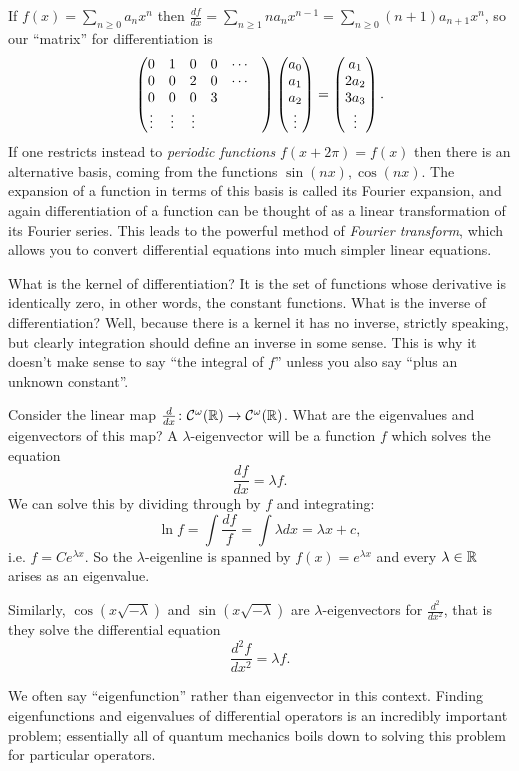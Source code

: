 \documentclass{article}
\begin{document}
If \(f(x)=\sum_{n\geq 0}a_nx^n\) then \(\frac{df}{dx}=\sum_{n\geq 1}
na_nx^{n-1}=\sum_{n\geq 0}(n+1)a_{n+1}x^n\), so our ``matrix'' for
differentiation is
\[\begin{pmatrix} 0 & 1 & 0 & 0 & \cdots \\ 0 & 0 & 2 & 0 & \cdots \\0 & 0 & 0 & 3 &
\\ \vdots & \vdots & \vdots & & &\end{pmatrix}\begin{pmatrix} a_0 \\ a_1 \\ a_2
\\ \vdots\end{pmatrix}=\begin{pmatrix} a_1 \\ 2a_2 \\ 3a_3\\\vdots\end{pmatrix}.\]
If one restricts instead to {\em periodic functions}
\(f(x+2\pi)=f(x)\) then there is an alternative basis, coming from the
functions \(\sin(nx),\cos(nx)\). The expansion of a function in terms
of this basis is called its Fourier expansion, and again
differentiation of a function can be thought of as a linear
transformation of its Fourier series. This leads to the powerful
method of {\em Fourier transform}, which allows you to convert
differential equations into much simpler linear equations.


\begin{Example}
What is the kernel of differentiation? It is the set of functions
whose derivative is identically zero, in other words, the constant
functions. What is the inverse of differentiation? Well, because
there is a kernel it has no inverse, strictly speaking, but clearly
integration should define an inverse in some sense. This is why it
doesn't make sense to say ``the integral of \(f\)'' unless you also
say ``plus an unknown constant''.


\end{Example}
\begin{Example}
Consider the linear map
\(\frac{d}{dx}\colon\mathcal{C}^{\omega}(\mathbb{R})\to\mathcal{C}^{\omega}(\mathbb{R})\). What
are the eigenvalues and eigenvectors of this map? A
\(\lambda\)-eigenvector will be a function \(f\) which solves the
equation \[\frac{df}{dx}=\lambda f.\] We can solve this by dividing
through by \(f\) and integrating: \[\ln
f=\int\frac{df}{f}=\int\lambda dx=\lambda x+c,\]
i.e. \(f=Ce^{\lambda x}\). So the \(\lambda\)-eigenline is spanned
by \(f(x)=e^{\lambda x}\) and every \(\lambda\in\mathbb{R}\) arises as an
eigenvalue.


\end{Example}
\begin{Example}
Similarly, \(\cos(x\sqrt{-\lambda})\) and \(\sin(x\sqrt{-\lambda})\)
are \(\lambda\)-eigenvectors for \(\frac{d^2}{dx^2}\), that is they
solve the differential equation
\[\frac{d^2f}{dx^2}=\lambda f.\]


\end{Example}
We often say ``eigenfunction'' rather than eigenvector in this
context. Finding eigenfunctions and eigenvalues of differential
operators is an incredibly important problem; essentially all of
quantum mechanics boils down to solving this problem for particular
operators.
\end{document}
